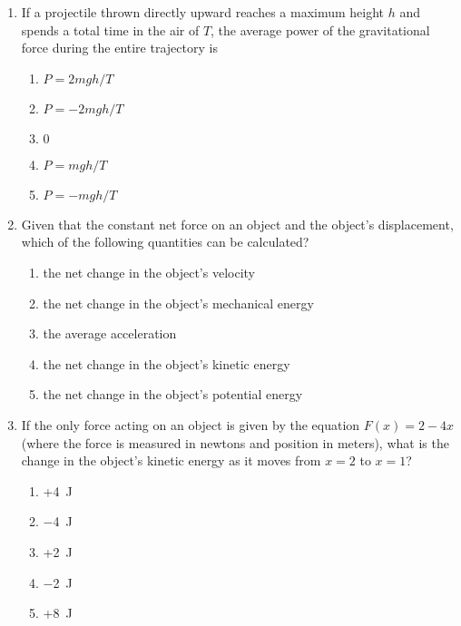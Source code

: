\documentclass{../../oss-apphys}
\begin{document}
\begin{multicols}{2}
\begin{enumerate}[resume,leftmargin=18pt]
  \item If a projectile thrown directly upward reaches a maximum height $h$ and
    spends a total time in the air of $T$, the average power of the
    gravitational force during the entire trajectory is
    \begin{enumerate}[noitemsep,topsep=0pt,leftmargin=18pt,label=(\Alph*)]
    \item $P=2mgh/T$
    \item $P=-2mgh/T$
    \item $0$
    \item $P=mgh/T$
    \item $P=-mgh/T$
    \end{enumerate}

  \item Given that the constant net force on an object and the object's 
    displacement, which of the following quantities can be calculated?
    \begin{enumerate}[noitemsep,topsep=0pt,leftmargin=18pt,label=(\Alph*)]
    \item the net change in the object's velocity
    \item the net change in the object's mechanical energy
    \item the average acceleration
    \item the net change in the object's kinetic energy
    \item the net change in the object's potential energy
    \end{enumerate}

  \item If the only force acting on an object is given by the equation
    $F(x)=2-4x$ (where the force is measured in newtons and position in meters),
    what is the change in the object's kinetic energy as it moves from $x=2$ to
    $x=1$?
    \begin{enumerate}[noitemsep,topsep=0pt,leftmargin=18pt,label=(\Alph*)]
    \item +\SI{4}{\joule}
    \item \SI{-4}{\joule}
    \item +\SI{2}{\joule}
    \item \SI{-2}{\joule}
    \item +\SI{8}{\joule}
    \end{enumerate}


\end{enumerate}
\end{multicols}
\end{document}
